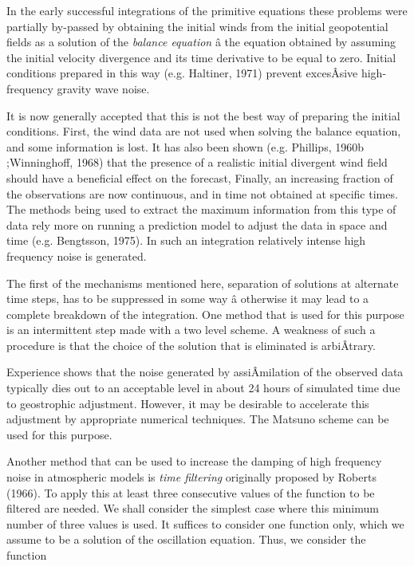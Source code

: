 In the early successful integrations of the primitive equations these
problems were partially by-passed by obtaining the initial winds from
the initial geopotential fields as a solution of the \emph{balance
equation} â the equation obtained by assuming the initial velocity
divergence and its time derivative to be equal to zero. Initial
conditions prepared in this way (e.g. Haltiner, 1971) prevent excesÂ­sive
high-frequency gravity wave noise.

It is now generally accepted that this is not the best way of preparing
the initial conditions. First, the wind data are not used when solving
the balance equation, and some information is lost. It has also been
shown (e.g. Phillips, 1960b ;Winninghoff, 1968) that the presence of a
realistic initial divergent wind field should have a beneficial effect
on the forecast, Finally, an increasing fraction of the observations are
now continuous, and in time not obtained at specific times. The methods
being used to extract the maximum information from this type of data
rely more on running a prediction model to adjust the data in space and
time (e.g. Bengtsson, 1975). In such an integration relatively intense
high frequency noise is generated.

The first of the mechanisms mentioned here, separation of solutions at
alternate time steps, has to be suppressed in some way â otherwise it
may lead to a complete breakdown of the integration. One method that is
used for this purpose is an intermittent step made with a two level
scheme. A weakness of such a procedure is that the choice of the
solution that is eliminated is arbiÂ­trary.

Experience shows that the noise generated by assiÂ­milation of the
observed data typically dies out to an acceptable level in about 24
hours of simulated time due to geostrophic adjustment. However, it may
be desirable to accelerate this adjustment by appropriate numerical
techniques. The Matsuno scheme can be used for this purpose.

Another method that can be used to increase the damping of high
frequency noise in atmospheric models is \emph{time filtering}
originally proposed by Roberts (1966). To apply this at least three
consecutive values of the function to be filtered are needed. We shall
consider the simplest case where this minimum number of three values is
used. It suffices to consider one function only, which we assume to be a
solution of the oscillation equation. Thus, we consider the function

